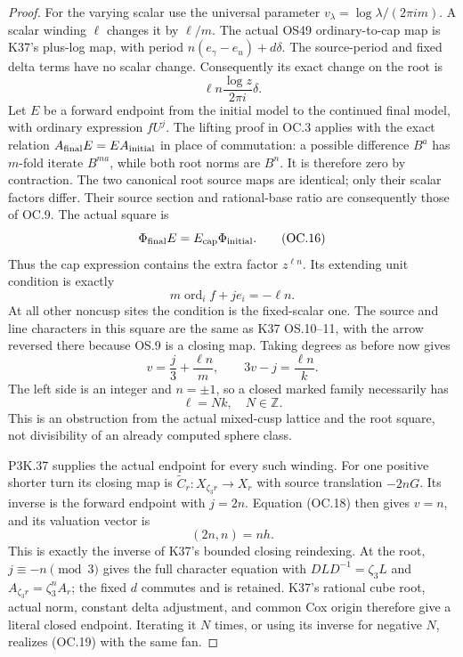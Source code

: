 \begin{proof}
For the varying scalar use the universal parameter
\(v_\lambda=\log\lambda/(2\pi i m)\). A scalar winding
\(\ell\) changes it by \(\ell/m\). The actual OS49
ordinary-to-cap map is K37's plus-log map, with period
\(n(e_\gamma-e_u)+d\delta\). The source-period and fixed
delta terms have no scalar change. Consequently its exact change
on the root is
\[
                  \ell n\frac{\log z}{2\pi i}\delta.    \tag{OC.15}
\]
Let \(E\) be a forward endpoint from the initial model to the
continued final model, with ordinary expression \(fU^j\).
The lifting proof in OC.3 applies with the exact relation
\(A_{\rm final}E=EA_{\rm initial}\) in place of commutation:
a possible difference \(B^a\) has \(m\)-fold iterate
\(B^{ma}\), while both root norms are \(B^n\). It is
therefore zero by contraction. The two canonical root source maps
are identical; only their scalar factors differ. Their source
section and rational-base ratio are consequently those of OC.9.
The actual square is
\[
          \Phi_{\rm final}E=E_{\rm cap}\Phi_{\rm initial}.
                                                               \tag{OC.16}
\]
Thus the cap expression contains the extra factor \(z^{\ell n}\).
Its extending unit condition is exactly
\[
        m\operatorname{ord}_{i}f+je_i=-\ell n.            \tag{OC.17}
\]
At all other noncusp sites the condition is the fixed-scalar one.
The source and line characters in this square are the same as K37
OS.10--11, with the arrow reversed there because OS.9 is a closing
map. Taking degrees as before now gives
\[
             v=\frac j3+\frac{\ell n}{m},\qquad
                      3v-j=\frac{\ell n}{k}.             \tag{OC.18}
\]
The left side is an integer and \(n=\pm1\), so a closed
marked family necessarily has
\[
                              \ell=Nk,\quad N\in\mathbb Z.
                                                               \tag{OC.19}
\]
This is an obstruction from the actual mixed-cusp lattice and the
root square, not divisibility of an already computed sphere class.

P3K.37 supplies the actual endpoint for every such winding. For one
positive shorter turn its closing map is
\(\widetilde C_r:X_{\zeta_3r}\to X_r\) with source
translation \(-2nG\). Its inverse is the forward endpoint with
\(j=2n\). Equation (OC.18) then gives \(v=n\), and its
valuation vector is
\[
                           (2n,n)=n h.                  \tag{OC.20}
\]
This is exactly the inverse of K37's bounded closing reindexing.
At the root, \(j\equiv-n\pmod3\) gives the full character
equation with \(DLD^{-1}=\zeta_3L\) and
\(A_{\zeta_3r}=\zeta_3^n A_r\); the fixed \(d\)
commutes and is retained. K37's rational cube root, actual norm,
constant delta adjustment, and common Cox origin therefore give a
literal closed endpoint. Iterating it \(N\) times, or using its
inverse for negative \(N\), realizes (OC.19) with the same fan.


\end{proof}
